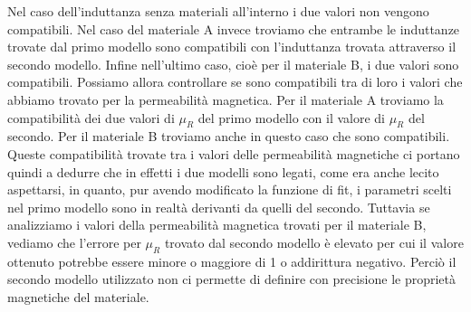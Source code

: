 \documentclass[
    rmp,
    floatfix,
    reprint, 
    superscriptaddress, 
    altaffilletter, 
    amsmath, 
    amssymb, 
    a4paper]{revtex4-2}
\begin{document}
Nel caso dell'induttanza senza materiali all'interno i due valori non vengono compatibili. Nel caso del materiale A invece troviamo che entrambe le induttanze trovate dal primo modello sono compatibili con l'induttanza trovata attraverso il secondo modello. Infine nell'ultimo caso, cioè per il materiale B, i due valori sono compatibili. Possiamo allora controllare se sono compatibili tra di loro i valori che abbiamo trovato per la permeabilità magnetica. 
Per il materiale A troviamo la compatibilità dei due valori di $\mu_R$ del primo modello con il valore di $\mu_R$ del secondo. 
Per il materiale B troviamo anche in questo caso che sono compatibili. Queste compatibilità trovate tra i valori delle permeabilità magnetiche ci portano quindi a dedurre che in effetti i due modelli sono legati, come era anche lecito aspettarsi, in quanto, pur avendo modificato la funzione di fit, i parametri scelti nel primo modello sono in realtà derivanti da quelli del secondo.
Tuttavia se analizziamo i valori della permeabilità magnetica trovati per il materiale B, vediamo che l'errore per $\mu_R$ trovato dal secondo modello è elevato per cui il valore ottenuto potrebbe essere minore o maggiore di 1 o addirittura negativo. Perciò il secondo modello utilizzato non ci permette di definire con precisione le proprietà magnetiche del materiale. 









\end{document}
